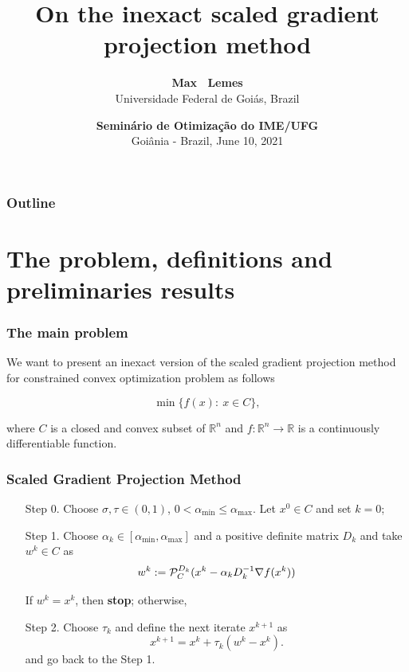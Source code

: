 \documentclass[xcolor=dvipsnames,aspectratio=169,13pt]{beamer} %
\title
  {
    On the inexact scaled gradient projection method
  }
\author[M. ~Lemes] %
  {
   \textbf{Max ~Lemes}\\
   Universidade Federal de Goiás, Brazil
  }
\institute[Federal University of Goiás] %
  {
   Joint work with: \textbf{Orizon P. ~Ferreira (IME/UFG)}, 
                    \textbf{Leandro F. Prudente (IME/UFG)}.
  }
\date[Goiânia  June 10,    2021]
  {
    \textcolor{UFGorange}{\textbf{Seminário de Otimização do IME/UFG}}\\
    Goiânia - Brazil, June 10, 2021
  }
\begin{document}
\maketitle

\begin{frame}
  \frametitle{Outline}
  \tableofcontents
\end{frame}


\section{The problem,  definitions and preliminaries results}


\begin{frame}
  \frametitle{The main problem}

  We want to present an inexact version of the scaled gradient projection method  for  \textcolor{UFGred}{constrained convex optimization problem} as follows

  \bigskip

  \begin{equation} \label{eq:OptP}
    \min \{ f(x) :~   x\in C\},
  \end{equation}

  \bigskip

  where $C$ is a closed and convex subset of $\mathbb{R}^n$ and $f:\mathbb{R}^n \to \mathbb{R}$ is a continuously differentiable function.


\end{frame}


\begin{frame}
  \frametitle{Scaled Gradient Projection Method}

  \begin{enumerate}
    \item[Step 0.] Choose  $\sigma, \tau \in (0, 1)$, $0 < \alpha_{\min} \leq \alpha_{\max}$. Let $x^0\in C$ and set $k=0$;

    \item[Step 1.] Choose $\alpha_k\in [\alpha_{\min}, \alpha_{\max}]$ and a positive definite matrix $D_k$ and take  $w^{k}\in C$  as
      \begin{equation*}
        w^k := {\cal P}_{C}^{D_k} (x^{k}-\alpha_k D_k^{-1}\nabla f(x^{k}))
      \end{equation*}

      If $w^k= x^k$, then {\bf stop}; otherwise,
    \item [Step 2.] Choose $\tau_k$ and define the next iterate $x^{k+1}$ as
          \begin{equation} \label{eq:IterArm}
            x^{k+1} = x^{k} + \tau_k (w^k - x^{k}).
          \end{equation}
          and go back to the Step 1.
  \end{enumerate}
\end{frame}
\end{document}
